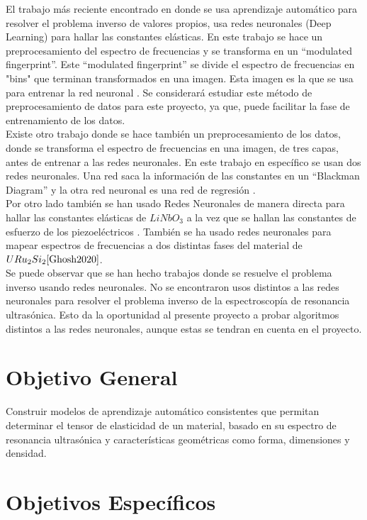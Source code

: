 \documentclass[12pt]{article}
\begin{document}
El trabajo más reciente encontrado en donde se usa aprendizaje automático para resolver el problema inverso de valores propios, usa redes neuronales (Deep Learning) para hallar las constantes elásticas. En este trabajo se hace un preprocesamiento del espectro de frecuencias y se transforma en un ``modulated fingerprint''. Este ``modulated fingerprint'' se divide el espectro de frecuencias en "bins" que terminan transformados en una imagen. Esta imagen es la que se usa para entrenar la red neuronal \cite{Liu2023}. Se considerará estudiar este método de preprocesamiento de datos para este proyecto, ya que, puede facilitar la fase de entrenamiento de los datos.
\\
Existe otro trabajo donde se hace también un preprocesamiento de los datos, donde se transforma el espectro de frecuencias en una imagen, de tres capas, antes de entrenar a las redes neuronales. En este trabajo en específico se usan dos redes neuronales. Una red saca la información de las constantes en un ``Blackman Diagram'' y la otra red neuronal es una red de regresión \cite{Fukuda2023}. 
\\
Por otro lado también se han usado Redes Neuronales de manera directa para hallar las constantes elásticas de $LiNbO_3$ a la vez que se hallan las constantes de esfuerzo de los piezoeléctricos \cite{Yang2022}. También se ha usado redes neuronales para mapear espectros de frecuencias a dos distintas fases del material de $URu_{2}Si_{2} \cite{Ghosh2020}$. 
\\
Se puede observar que se han hecho trabajos donde se resuelve el problema inverso usando redes neuronales. No se encontraron usos distintos a las redes neuronales para resolver el problema inverso de la espectroscopía de resonancia ultrasónica. Esto da la oportunidad al presente proyecto a probar algoritmos distintos a las redes neuronales, aunque estas se tendran en cuenta en el proyecto. 

\section{Objetivo General}

Construir modelos de aprendizaje automático consistentes que permitan determinar el tensor de elasticidad de un material, basado en su espectro de resonancia ultrasónica y características geométricas como forma, dimensiones y densidad.
\section{Objetivos Específicos}
\end{document}
